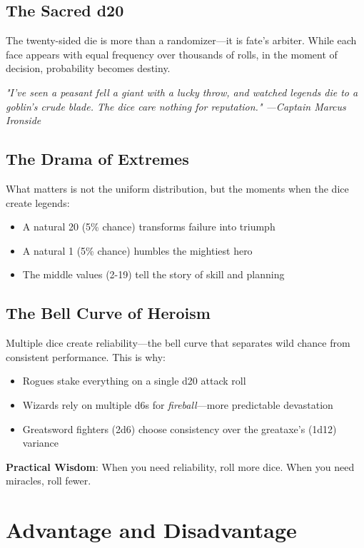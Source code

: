 \documentclass[11pt,letterpaper,openany]{book}
\newcommand{\fantasyquote}[1]{%
\begin{center}
\textit{\large #1}
\end{center}
}
\newcommand{\spell}[1]{\textcolor{mysticblue}{\textit{#1}}}
\begin{document}
\subsection{The Sacred d20}

The twenty-sided die is more than a randomizer—it is fate's arbiter. While each face appears with equal frequency over thousands of rolls, in the moment of decision, probability becomes destiny.

\fantasyquote{"I've seen a peasant fell a giant with a lucky throw, and watched legends die to a goblin's crude blade. The dice care nothing for reputation." —Captain Marcus Ironside}

\subsection{The Drama of Extremes}

What matters is not the uniform distribution, but the moments when the dice create legends:
\begin{itemize}
    \item A natural 20 (5\% chance) transforms failure into triumph
    \item A natural 1 (5\% chance) humbles the mightiest hero
    \item The middle values (2-19) tell the story of skill and planning
\end{itemize}

\subsection{The Bell Curve of Heroism}

Multiple dice create reliability—the bell curve that separates wild chance from consistent performance. This is why:
\begin{itemize}
    \item Rogues stake everything on a single d20 attack roll
    \item Wizards rely on multiple d6s for \spell{fireball}—more predictable devastation
    \item Greatsword fighters (2d6) choose consistency over the greataxe's (1d12) variance
\end{itemize}

\textbf{Practical Wisdom}: When you need reliability, roll more dice. When you need miracles, roll fewer.

\section{Advantage and Disadvantage}
\end{document}

